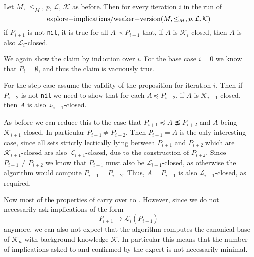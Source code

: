 \begin{Proposition}
  \label{prop:explore-implications-weaker-version-closedness-persists}
  Let $M$, $\leq_{M}$, $p$, $\mathcal{L}$, $\mathcal{K}$ as before.  Then for every
  iteration $i$ in the run of
  \begin{equation*}
    \text{\lstinline{explore-implications/weaker-version}}(M, \leq_{M}, p, \mathcal{L}, \mathcal{K})
  \end{equation*}
  if $P_{i+1}$ is not \lstinline{nil}, it is true for all $A \prec P_{i+1}$ that, if $A$
  is $\mathcal{K}_{i}$-closed, then $A$ is also $\mathcal{L}_{i}$-closed.
\end{Proposition}
\begin{Proof}
  We again show the claim by induction over $i$.  For the base case $i = 0$ we know that
  $P_{i} = \emptyset$, and thus the claim is vacuously true.

  For the step case assume the validity of the proposition for iteration $i$.  Then if
  $P_{i+2}$ is not \lstinline{nil} we need to show that for each $A \preceq P_{i+2}$, if
  $A$ is $\mathcal{K}_{i+1}$-closed, then $A$ is also $\mathcal{L}_{i+1}$-closed.

  As before we can reduce this to the case that $P_{i+1} \preceq A \precneq P_{i+2}$ and
  $A$ being $\mathcal{K}_{i+1}$-closed.  In particular $P_{i+1} \neq P_{i+2}$.  Then
  $P_{i+1} = A$ is the only interesting case, since all sets strictly lectically lying
  between $P_{i+1}$ and $P_{i+2}$ which are $\mathcal{K}_{i+1}$-closed are also
  $\mathcal{L}_{i+1}$-closed, due to the construction of $P_{i+2}$.  Since $P_{i+1} \neq
  P_{i+2}$ we know that $P_{i+1}$ must also be $\mathcal{L}_{i+1}$-closed, as otherwise
  the algorithm would compute $P_{i+1} = P_{i+2}$.  Thus, $A = P_{i+1}$ is also
  $\mathcal{L}_{i+1}$-closed, as required.
\end{Proof}

Now most of the properties of  carry over to
.  However, since we do not necessarily ask
implications of the form
\begin{equation}
  \label{eq:39}
  P_{i+1} \to \mathcal{L}_{i}(P_{i+1})
\end{equation}
anymore, we can also not expect that the algorithm computes the canonical base of
$\mathcal{K}_{n}$ with background knowledge $\mathcal{K}$.  In particular this means that
the number of implications asked to and confirmed by the expert is not necessarily
minimal.

